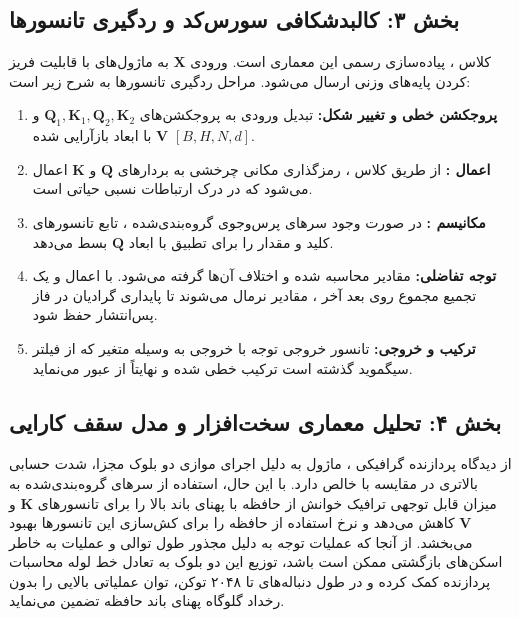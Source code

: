 \subsection*{بخش ۳: کالبدشکافی سورس‌کد و ردگیری تانسورها }
کلاس ، پیاده‌سازی رسمی این معماری است. ورودی $\mathbf{X}$ به ماژول‌های  با قابلیت فریز کردن پایه‌های وزنی ارسال می‌شود.
مراحل ردگیری تانسورها به شرح زیر است:
\begin{enumerate}
    \item \textbf{پروجکشن خطی و تغییر شکل:} تبدیل ورودی به پروجکشن‌های $\mathbf{Q}_1, \mathbf{K}_1, \mathbf{Q}_2, \mathbf{K}_2$ و $\mathbf{V}$ با ابعاد بازآرایی شده $[B, H, N, d]$.
    \item \textbf{اعمال :} از طریق کلاس ، رمزگذاری مکانی چرخشی به بردارهای $\mathbf{Q}$ و $\mathbf{K}$ اعمال می‌شود که در درک ارتباطات نسبی حیاتی است.
    \item \textbf{مکانیسم :} در صورت وجود سرهای پرس‌وجوی گروه‌بندی‌شده ، تابع  تانسورهای کلید و مقدار را برای تطبیق با ابعاد $\mathbf{Q}$ بسط می‌دهد.
    \item \textbf{توجه تفاضلی:} مقادیر  محاسبه شده و اختلاف آن‌ها گرفته می‌شود. با اعمال  و یک تجمیع مجموع روی بعد آخر ، مقادیر نرمال می‌شوند تا پایداری گرادیان در فاز پس‌انتشار حفظ شود.
    \item \textbf{ترکیب و خروجی:} تانسور خروجی توجه با خروجی  به وسیله متغیر  که از فیلتر سیگموید  گذشته است ترکیب خطی شده و نهایتاً از  عبور می‌نماید.
\end{enumerate}

\subsection*{بخش ۴: تحلیل معماری سخت‌افزار و مدل سقف کارایی }
از دیدگاه پردازنده گرافیکی ، ماژول  به دلیل اجرای موازی دو بلوک مجزا، شدت حسابی  بالاتری در مقایسه با  خالص دارد. با این حال، استفاده از سرهای گروه‌بندی‌شده  به میزان قابل توجهی ترافیک خوانش از حافظه با پهنای باند بالا  را برای تانسورهای $\mathbf{K}$ و $\mathbf{V}$ کاهش می‌دهد و نرخ استفاده از حافظه  را برای کش‌سازی این تانسورها بهبود می‌بخشد.
از آنجا که عملیات توجه به دلیل مجذور طول توالی  و عملیات  به خاطر اسکن‌های بازگشتی ممکن است  باشد، توزیع این دو بلوک به تعادل خط لوله محاسبات پردازنده کمک کرده و در طول دنباله‌های تا ۲۰۴۸ توکن، توان عملیاتی بالایی را بدون رخداد گلوگاه پهنای باند حافظه تضمین می‌نماید.

